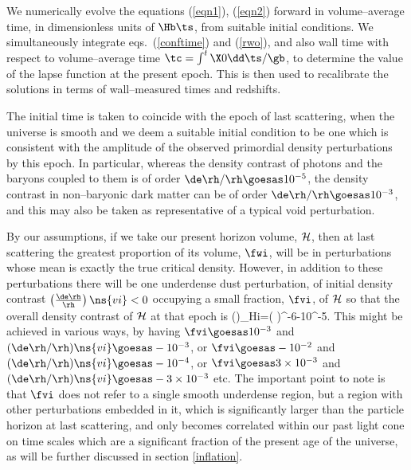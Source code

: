 \documentclass[12pt]{iopart}
\begin{document}
We numerically evolve the equations (\ref{eqn1}), (\ref{eqn2})
forward in volume--average time, in dimensionless units of $\Hb\ts$,
from suitable initial conditions. We simultaneously integrate eqs.\
(\ref{conftime}) and (\ref{rwo}), and also wall time with respect to
volume--average time $\tc=\int^t\X0\dd\ts/\gb$, to determine the
value of the lapse function at the present epoch. This is then used to
recalibrate the solutions in terms of wall--measured times and redshifts.

The initial time is taken to coincide with the epoch of last scattering,
when the universe is smooth and we deem a suitable initial condition to be one
which is consistent with the amplitude of the observed primordial density
perturbations by this epoch. In particular, whereas the density contrast of
photons and the baryons coupled to them is of order $\de\rh/\rh\goesas10^{-5}
$, the density contrast in non--baryonic dark matter can be of order
$\de\rh/\rh\goesas10^{-3}$, and this may also be taken as representative
of a typical void perturbation.

By our assumptions, if we take our present horizon volume, $\cal H$,
then at last scattering the greatest proportion of its volume, $\fwi$,
will be in perturbations whose mean is exactly the true
critical density. However, in addition to these perturbations there will
be one underdense dust perturbation, of initial density contrast
$\left(\de\rh\over\rh\right)\ns{vi}<0$ occupying a small fraction, $\fvi$,
of $\cal H$ so that the overall density contrast of $\cal H$ at that epoch is
\beq
\left(\de\rh\over\rh\right)_{\!\cal H\hbox{\sevenrm i}}=\fvi\left(\de\rh\over
\rh\right)\ns{vi}\goesas-10^{-6}\w{to}-10^{-5}.\label{initc}\eeq
This might be achieved in various ways, by having $\fvi\goesas10^{-3}$
and $(\de\rh/\rh)\ns{vi}\goesas-10^{-3}$, or $\fvi\goesas-10^{-2}$ and
$(\de\rh/\rh)\ns{vi}\goesas-10^{-4}$, or $\fvi\goesas3\times 10^{-3}$
and $(\de\rh/\rh)\ns{vi}\goesas-3\times 10^{-3}$ etc. The important
point to note is that $\fvi$ does not refer to a single smooth
underdense region, but a region with other perturbations embedded in it,
which is significantly larger than the particle horizon at last scattering,
and only becomes correlated within our past light cone on time scales which
are a significant fraction of the present age of the universe, as will be
further discussed in section \ref{inflation}.
\end{document}
